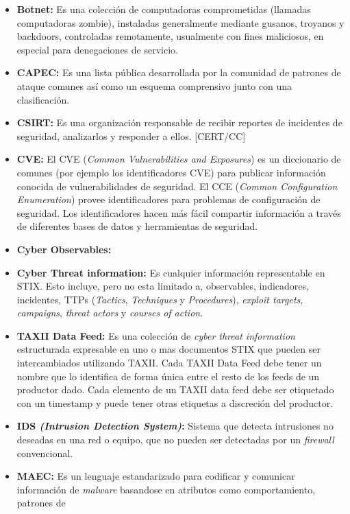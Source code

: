 \begin{itemize}
  \item \textbf{Botnet:} Es una colección de computadoras comprometidas (llamadas computadoras zombie), 
instaladas generalmente mediante gusanos, troyanos y backdoors, controladas 
remotamente, usualmente con fines maliciosos, en especial para denegaciones de 
servicio.
  \item \textbf{CAPEC:} Es una lista pública desarrollada por la comunidad de patrones de 
  ataque comunes así como un esquema comprensivo junto con una clasificación.
  \item \textbf{CSIRT:} Es una organización responsable de recibir reportes de incidentes de seguridad, analizarlos y responder a ellos. [CERT/CC]
  \item \textbf{CVE:} El CVE (\textit{Common Vulnerabilities and Exposures}) es un diccionario de comunes (por 
ejemplo los identificadores CVE) para publicar información conocida de 
vulnerabilidades de seguridad. El CCE (\textit{Common Configuration Enumeration}) provee 
identificadores para problemas de configuración de seguridad. Los 
identificadores hacen más fácil compartir información a través de diferentes 
bases de datos y herramientas de seguridad.
\item \textbf{Cyber Observables:}
 \item \textbf{Cyber Threat information:} Es cualquier información representable en STIX. 
 Esto incluye, pero no esta limitado a, observables, indicadores, incidentes, 
 TTPs (\textit{Tactics}, \textit{Techniques} y \textit{Procedures}), \textit{exploit targets}, \textit{campaigns}, \textit{threat 
 actors} y \textit{courses of action}.
 \item \textbf{TAXII Data Feed:} Es una colección de \textit{cyber threat information} 
 estructurada expresable en uno o mas documentos STIX que pueden ser 
 intercambiados utilizando TAXII. Cada TAXII Data Feed debe tener un 
 nombre que lo identifica de forma única entre el resto de los feeds de un 
 productor dado. Cada elemento de un TAXII data feed debe ser etiquetado con un 
 timestamp y puede tener otras etiquetas a discreción del productor.
 \item \textbf{IDS \textit{(Intrusion Detection System)}:} Sistema que detecta intrusiones no deseadas en una 
red o equipo, que no pueden ser detectadas por un \textit{firewall} convencional.
  \item \textbf{MAEC:} Es un lenguaje estandarizado para codificar y comunicar 
  información de \textit{malware} basandose en atributos como comportamiento, patrones de 

\end{itemize}
